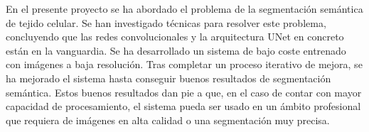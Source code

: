 
En el presente proyecto se ha abordado el problema de la segmentación semántica de tejido celular. Se han investigado técnicas para resolver este problema, concluyendo que las redes convolucionales y la arquitectura UNet en concreto están en la vanguardia. Se ha desarrollado un sistema de bajo coste entrenado con imágenes a baja resolución. Tras completar un proceso iterativo de mejora, se ha mejorado el sistema hasta conseguir buenos resultados de segmentación semántica. Estos buenos resultados dan pie a que, en el caso de contar con mayor capacidad de procesamiento, el sistema pueda ser usado en un ámbito profesional que requiera de imágenes en alta calidad o una segmentación muy precisa.